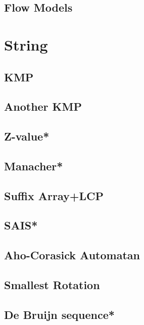 \subsection{Flow Models}

% 


\section{String}
\subsection{KMP}

\subsection{Another KMP}

\subsection{Z-value*} %

\subsection{Manacher*} %

\subsection{Suffix Array+LCP}

\subsection{SAIS*} %

\subsection{Aho-Corasick Automatan}

\subsection{Smallest Rotation}

\subsection{De Bruijn sequence*} %


